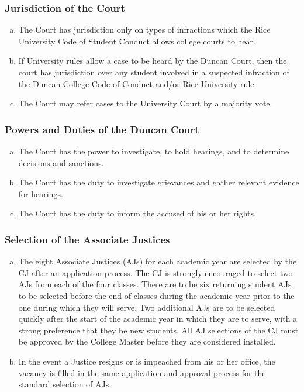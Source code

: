 \documentclass[USletter,12pt]{article}
\begin{document}
\subsubsection{Jurisdiction of the Court}
\begin{enumerate}[(a)]
\item The Court has jurisdiction only on types of infractions which the Rice University Code of Student Conduct allows college courts to hear.  
\item If University rules allow a case to be heard by the Duncan Court, then the court has jurisdiction over any student involved in a suspected infraction of the Duncan College Code of Conduct and/or Rice University rule.
\item The Court may refer cases to the University Court by a majority vote.
\end{enumerate}

\subsubsection{Powers and Duties of the Duncan Court}
\begin{enumerate}[(a)]
\item The Court has the power to investigate, to hold hearings, and to determine decisions and sanctions.
\item The Court has the duty to investigate grievances and gather relevant evidence for hearings.
\item The Court has the duty to inform the accused of his or her rights.
\end{enumerate}

\subsubsection{Selection of the Associate Justices}
\begin{enumerate}[(a)]
\item The eight Associate Justices (AJs) for each academic year are selected by the CJ after an application process.  The CJ is strongly encouraged to select two AJs from each of the four classes.  There are to be six returning student AJs to be selected before the end of classes during the academic year prior to the one during which they will serve.  Two additional AJs are to be selected quickly after the start of the academic year in which they are to serve, with a strong preference that they be new students.  All AJ selections of the CJ must be approved by the College Master before they are considered installed.
\item In the event a Justice resigns or is impeached from his or her office, the vacancy is filled in the same application and approval process for the standard selection of AJs.
\end{enumerate}
\end{document}
